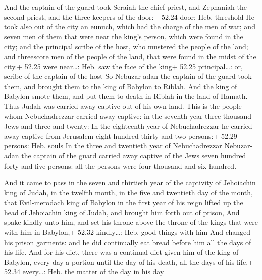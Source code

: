 And the captain of the guard took Seraiah the chief
priest, and Zephaniah the second priest, and the three keepers of the
door:+ 52.24 door: Heb. threshold  He took also out of the
city an eunuch, which had the charge of the men of war; and seven men of
them that were near the king's person, which were found in the city; and
the principal scribe of the host, who mustered the people of the land;
and threescore men of the people of the land, that were found in the
midst of the city.+ 52.25 were near\ldots: Heb. saw the face of the
king+ 52.25 principal\ldots: or, scribe of the captain of the host
 So Nebuzar-adan the captain of the guard took them, and
brought them to the king of Babylon to Riblah.  And the
king of Babylon smote them, and put them to death in Riblah in the land
of Hamath. Thus Judah was carried away captive out of his own land.
 This is the people whom Nebuchadrezzar carried away
captive: in the seventh year three thousand Jews and three and twenty:
 In the eighteenth year of Nebuchadrezzar he carried away
captive from Jerusalem eight hundred thirty and two persons:+ 52.29
persons: Heb. souls  In the three and twentieth year of
Nebuchadrezzar Nebuzar-adan the captain of the guard carried away
captive of the Jews seven hundred forty and five persons: all the
persons were four thousand and six hundred.

 And it came to pass in the seven and thirtieth year of
the captivity of Jehoiachin king of Judah, in the twelfth month, in the
five and twentieth day of the month, that Evil-merodach king of Babylon
in the first year of his reign lifted up the head of Jehoiachin king of
Judah, and brought him forth out of prison,  And spake
kindly unto him, and set his throne above the throne of the kings that
were with him in Babylon,+ 52.32 kindly\ldots: Heb. good things with him
 And changed his prison garments: and he did continually
eat bread before him all the days of his life.  And for his
diet, there was a continual diet given him of the king of Babylon, every
day a portion until the day of his death, all the days of his life.+
52.34 every\ldots: Heb. the matter of the day in his day
